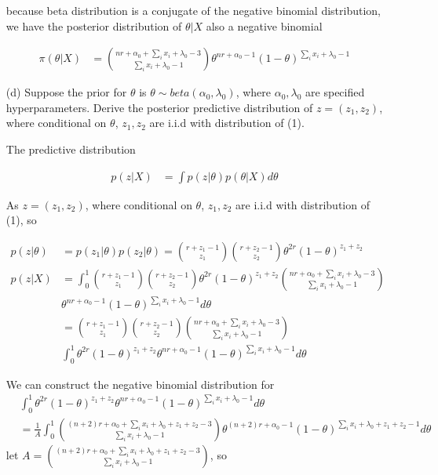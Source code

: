 \begin{itemize}
because beta distribution is a conjugate of the negative binomial distribution, we have the posterior distribution of $\theta|X$ also a negative binomial

	\begin{align*}
	\pi(\theta | X) & = {nr+\alpha_0+ \sum_i x_i + \lambda_0-3 \choose \sum_i x_i + \lambda_0-1} \theta^{nr + \alpha_0-1} (1-\theta)^{\sum_i x_i + \lambda_0-1}
\end{align*}

	\item[(d)] Suppose the prior for $\theta$ is $\theta \sim beta(\alpha_0, \lambda_0)$, where $\alpha_0, \lambda_0$ are specified hyperparameters. Derive the posterior predictive distribution of $z=(z_1, z_2)$, where conditional on $\theta$, $z_1, z_2$ are i.i.d with distribution of (1).
	
	The predictive distribution 
	
	\begin{align*}
		p(z | X) & = \int p(z| \theta) p(\theta | X) d \theta
	\end{align*}

As $z=(z_1, z_2)$, where conditional on $\theta$, $z_1, z_2$ are i.i.d with distribution of (1), so

\begin{align*}
	p(z | \theta) & = p(z_1| \theta) p(z_2|\theta) = {r+z_1-1 \choose z_1} {r+z_2-1 \choose z_2} \theta^{2r} (1-\theta)^{z_1+z_2} \\
	p(z | X) & = \int_{0}^{1} {r+z_1-1 \choose z_1} {r+z_2-1 \choose z_2} \theta^{2r} (1-\theta)^{z_1+z_2}  {nr+\alpha_0+ \sum_i x_i + \lambda_0-3 \choose \sum_i x_i + \lambda_0-1} \\
	& \theta^{nr + \alpha_0-1} (1-\theta)^{\sum_i x_i + \lambda_0-1} d \theta\\
	&= {r+z_1-1 \choose z_1} {r+z_2-1 \choose z_2} {nr+\alpha_0+ \sum_i x_i + \lambda_0-3 \choose \sum_i x_i + \lambda_0-1} \\
	& \int_{0}^{1}  \theta^{2r} (1-\theta)^{z_1+z_2} \theta^{nr + \alpha_0-1} (1-\theta)^{\sum_i x_i + \lambda_0-1} d \theta
\end{align*}

We can construct the negative binomial distribution for
\begin{align*}
	& \int_{0}^{1}  \theta^{2r} (1-\theta)^{z_1+z_2} \theta^{nr + \alpha_0-1} (1-\theta)^{\sum_i x_i + \lambda_0-1} d \theta \\
	&= \frac{1}{A} \int_{0}^{1} {(n+2) r + \alpha_0 + \sum_i x_i + \lambda_0 + z_1+z_2 -3 \choose \sum_i x_i + \lambda_0-1} \theta^{(n+2) r + \alpha_0-1} (1-\theta)^{\sum_i x_i + \lambda_0 + z_1+z_2 -1} d \theta 
\end{align*}
let $A = {(n+2) r + \alpha_0 + \sum_i x_i + \lambda_0 + z_1+z_2 -3 \choose \sum_i x_i + \lambda_0-1}$, so


\end{itemize}
